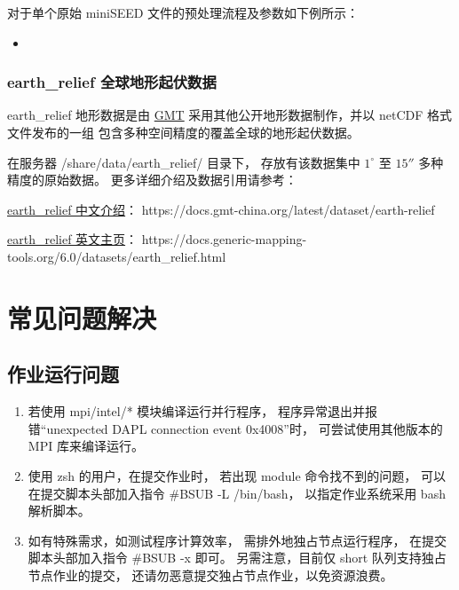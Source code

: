 \documentclass[UTF8]{ctexart}
\newcommand{\mynnote}[1]{\colorbox{gray!15}{\color{blue!65}#1}}
\newcommand{\insertbash}[2]{\begin{itemize}\item[]\end{itemize}}
\begin{document}
对于单个原始 miniSEED 文件的预处理流程及参数如下例所示：
\insertbash{material/cencpp.sh}{CENC 波形数据预处理示例}

\subsubsection{earth\_relief 全球地形起伏数据}
earth\_relief 地形数据是由 \href{https://www.generic-mapping-tools.org}{GMT} 
采用其他公开地形数据制作，并以 netCDF 格式文件发布的一组
包含多种空间精度的覆盖全球的地形起伏数据。

在服务器 /share/data/earth\_relief/ 目录下，
存放有该数据集中 $1^\circ$ 至 $15''$ 多种精度的原始数据。
更多详细介绍及数据引用请参考：

\href{https://docs.gmt-china.org/latest/dataset/earth-relief}{earth\_relief 中文介绍}：
https://docs.gmt-china.org/latest/dataset/earth-relief

\href{https://docs.generic-mapping-tools.org/6.0/datasets/earth_relief.html}{earth\_relief 英文主页}：
https://docs.generic-mapping-tools.org/6.0/datasets/earth\_relief.html

\section{常见问题解决}
\subsection{作业运行问题}
\begin{enumerate}[\hspace{10mm}1、]
  \item 若使用 mpi/intel/* 模块编译运行并行程序，
    程序异常退出并报错“unexpected DAPL connection event 0x4008”时，
    可尝试使用其他版本的 MPI 库来编译运行。
  \item 使用 zsh 的用户，在提交作业时，
    若出现 module 命令找不到的问题，
    可以在提交脚本头部加入指令 \mynnote{\#BSUB -L /bin/bash}，
    以指定作业系统采用 bash 解析脚本。
  \item 如有特殊需求，如测试程序计算效率，
    需排外地独占节点运行程序，
    在提交脚本头部加入指令 \mynnote{\#BSUB -x} 即可。
    另需注意，目前仅 short 队列支持独占节点作业的提交，
    还请勿恶意提交独占节点作业，以免资源浪费。
\end{enumerate}
\end{document}
